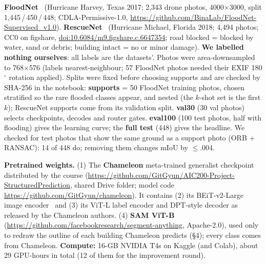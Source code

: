 \documentclass[10pt]{article}
\newcommand{\sect}[1]{\par\vspace{5pt}{\large\bfseries #1}\par\nobreak\vspace{1pt}\nobreak}
\begin{document}
\sect{3\quad Data and resources}
\textbf{FloodNet}~\cite{floodnet} (Hurricane Harvey, Texas 2017; 2,343 drone photos, 4000$\times$3000, split
1,445\,/\,450\,/\,448; CDLA-Permissive-1.0, \url{https://github.com/BinaLab/FloodNet-Supervised_v1.0}).
\textbf{RescueNet}~\cite{rescuenet} (Hurricane Michael, Florida 2018; 4,494 photos; CC0 on figshare,
\href{https://doi.org/10.6084/m9.figshare.c.6647354}{doi:10.6084/m9.figshare.c.6647354}; road blocked = blocked by water,
sand or debris; building intact = no or minor damage). \textbf{We labelled nothing ourselves}: all labels are the
datasets'. Photos were area-downsampled to 768$\times$576 (labels nearest-neighbour; 57 FloodNet photos needed their
EXIF 180$^\circ$ rotation applied). Splits were fixed before choosing supports and are checked by SHA-256 in the
notebook: \textbf{supports} = 50 FloodNet training photos, chosen stratified so the rare flooded classes appear, and
nested (the $k$-shot set is the first $k$); RescueNet supports come from its validation split. \textbf{val30} (30 val
photos) selects checkpoints, decodes and router gates. \textbf{eval100} (100 test photos, half with flooding) gives the
learning curve; the \textbf{full test} (448) gives the headline. We checked for test photos that show the same ground
as a support photo (ORB + RANSAC): 14 of 448 do; removing them changes mIoU by $\le$.004.

\textbf{Pretrained weights.} (1) The \textbf{Chameleon} meta-trained generalist checkpoint~\cite{chameleon} distributed
by the course (\url{https://github.com/GitGyun/AIC200-Project-StructuredPrediction}, shared Drive folder; model code
\url{https://github.com/GitGyun/chameleon}). It contains (2) its BEiT-v2-Large image encoder~\cite{beitv2} and (3) its
ViT-L label encoder and DPT-style decoder as released by the Chameleon authors. (4) \textbf{SAM ViT-B}~\cite{sam}
(\url{https://github.com/facebookresearch/segment-anything}, Apache-2.0), used only to redraw the outline of each
building Chameleon predicts (\S4); every class comes from Chameleon. \textbf{Compute:} 16-GB NVIDIA T4s on Kaggle (and
Colab), about 29 GPU-hours in total (12 of them for the improvement round).
\end{document}
